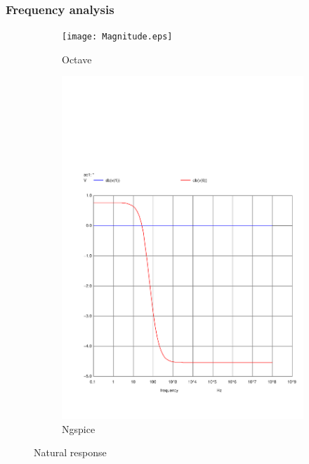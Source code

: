 \subsubsection{Frequency analysis}
\label{sec:Frequency analysis}

\indent



\begin{figure}[H]
\centering
\begin{subfigure}{.5\textwidth}
  \centering
  \texttt{[image: Magnitude.eps]}
  \caption{Octave}
\end{subfigure}%
\begin{subfigure}{.5\textwidth}
  \centering
  \includegraphics[width=.8\linewidth]{../Simulation/acm_db.pdf}
  \caption{Ngspice}
\end{subfigure}
\caption{Natural response}
\label{fig:test}
\end{figure}



